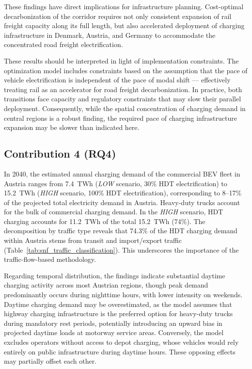         These findings have direct implications for infrastructure planning. Cost-optimal decarbonization of the corridor requires not only consistent expansion of rail freight capacity along its full length, but also accelerated deployment of charging infrastructure in Denmark, Austria, and Germany to accommodate the concentrated road freight electrification.
        
        These results should be interpreted in light of implementation constraints. The optimization model includes constraints based on the assumption that the pace of vehicle electrification is independent of the pace of modal shift — effectively treating rail as an accelerator for road freight decarbonization. In practice, both transitions face capacity and regulatory constraints that may slow their parallel deployment. Consequently, while the spatial concentration of charging demand in central regions is a robust finding, the required pace of charging infrastructure expansion may be slower than indicated here.

\newpage 
\subsection{Contribution 4 (RQ4)}

\noindent{}


In 2040, the estimated annual charging demand of the commercial \ac{BEV} fleet in Austria ranges from 7.4~TWh (\textit{LOW} scenario, 30\% \ac{HDT} electrification) to 15.2~TWh (\textit{HIGH} scenario, 100\% \ac{HDT} electrification), corresponding to 8--17\% of the projected total electricity demand in Austria. 
Heavy-duty trucks account for the bulk of commercial charging demand. In the \textit{HIGH} scenario, \ac{HDT} charging accounts for 11.2~TWh of the total 15.2~TWh (74\%). The decomposition by traffic type reveals that 74.3\% of the \ac{HDT} charging demand within Austria stems from transit and import/export traffic (Table~\ref{tab:snf_traffic_classification}). This underscores the importance of the traffic-flow-based methodology.

Regarding temporal distribution, the findings indicate substantial daytime charging activity across most Austrian regions, though peak demand predominantly occurs during nighttime hours, with lower intensity on weekends. Daytime charging demand may be overestimated, as the model assumes that highway charging infrastructure is the preferred option for heavy-duty trucks during mandatory rest periods, potentially introducing an upward bias in projected daytime loads at motorway service areas. Conversely, the model excludes operators without access to depot charging, whose vehicles would rely entirely on public infrastructure during daytime hours. These opposing effects may partially offset each other. 

